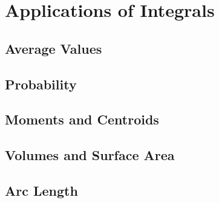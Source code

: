 \section{Applications of Integrals}

\subsection{Average Values}

\subsection{Probability}

\subsection{Moments and Centroids}

\subsection{Volumes and Surface Area}

\subsection{Arc Length}